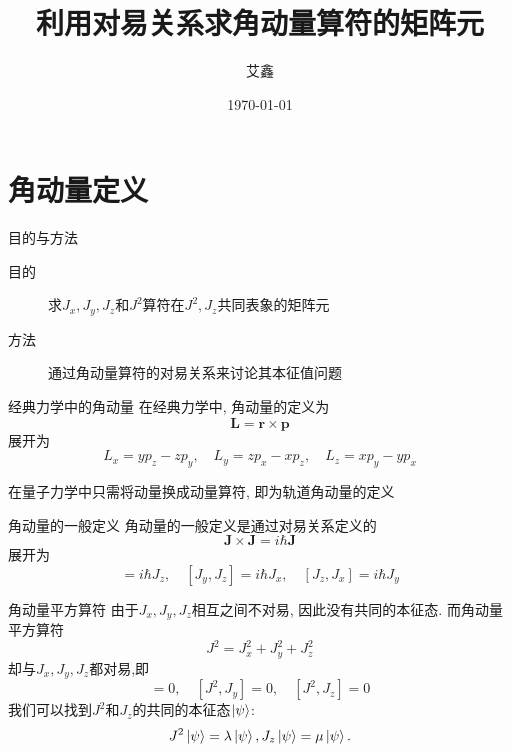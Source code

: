 \documentclass{beamer}
\title{利用对易关系求角动量算符的矩阵元}
\author{艾鑫}
\institute[三峡大学]{三峡大学\hspace{1em}理学院}
\date{\today}
\begin{document}
\maketitle

\section{角动量定义}

\begin{frame}{目的与方法}
\begin{description}
  \item[目的] 求$J_x,J_y,J_z$和$J^2$算符在$J^2,J_z$共同表象的矩阵元
  \item[方法] 通过角动量算符的对易关系来讨论其本征值问题
\end{description}
\end{frame}

\begin{frame}{经典力学中的角动量}
在经典力学中, 角动量的定义为
\begin{equation}
\bm{L} = \bm{r} \times \bm{p}
\end{equation}
展开为
\begin{equation}
L_x = yp_z - zp_y, \quad L_y = zp_x - xp_z, \quad L_z = xp_y - yp_x
\end{equation}

在量子力学中只需将动量换成动量算符, 即为轨道角动量的定义
\end{frame}

\begin{frame}{角动量的一般定义}
角动量的一般定义是通过对易关系定义的
\begin{equation}
\bm{J} \times \bm{J} = i \hbar \bm{J}
\end{equation}
展开为
\begin{equation}
[J_x, J_y] = i\hbar J_z , \quad [J_y, J_z] = i \hbar J_x , \quad [J_z, J_x] = i\hbar J_y
\end{equation}
\end{frame}

\begin{frame}{角动量平方算符}
由于$J_x, J_y, J_z$相互之间不对易, 因此没有共同的本征态. 而角动量平方算符
\begin{equation}
J^2 = J_x^2 + J_y^2 + J_z^2
\end{equation}
却与$J_x, J_y, J_z$都对易,即
\begin{equation}
[J^2,J_x] = 0, \quad [J^2, J_y] = 0, \quad [J^2, J_z] = 0
\end{equation}
我们可以找到$J^2$和$J_z$的共同的本征态$\ket{\psi}$:
\begin{equation}
J^2 \ket{\psi} = \lambda \ket{\psi}, J_z \ket{\psi} = \mu \ket{\psi}.
\end{equation}
\end{frame}
\end{document}
